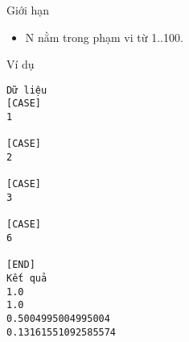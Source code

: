 Giới hạn  
\begin{itemize}
	\item     N nằm trong phạm vi từ 1..100.   
\end{itemize}
   Ví dụ  
\begin{verbatim}
Dữ liệu
[CASE]
1

[CASE]
2

[CASE]
3

[CASE]
6

[END]
Kết quả
1.0
1.0
0.5004995004995004
0.13161551092585574
\end{verbatim}